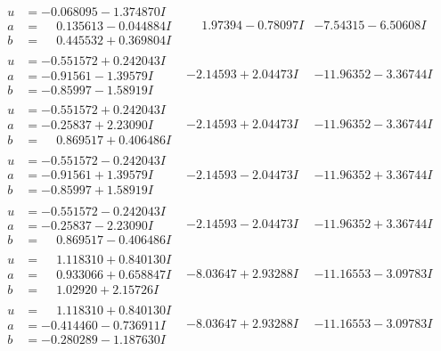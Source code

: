 \documentclass[1p]{elsarticle_modified}
\theoremstyle{definition}
\begin{document}
$$\begin{array}{c|c|c}
\begin{aligned}
u &= -0.068095 - 1.374870 I \\
a &= \phantom{-}0.135613 - 0.044884 I \\
b &= \phantom{-}0.445532 + 0.369804 I\end{aligned}
 & \phantom{-}1.97394 - 0.78097 I & -7.54315 - 6.50608 I \\ \hline\begin{aligned}
u &= -0.551572 + 0.242043 I \\
a &= -0.91561 - 1.39579 I \\
b &= -0.85997 - 1.58919 I\end{aligned}
 & -2.14593 + 2.04473 I & -11.96352 - 3.36744 I \\ \hline\begin{aligned}
u &= -0.551572 + 0.242043 I \\
a &= -0.25837 + 2.23090 I \\
b &= \phantom{-}0.869517 + 0.406486 I\end{aligned}
 & -2.14593 + 2.04473 I & -11.96352 - 3.36744 I \\ \hline\begin{aligned}
u &= -0.551572 - 0.242043 I \\
a &= -0.91561 + 1.39579 I \\
b &= -0.85997 + 1.58919 I\end{aligned}
 & -2.14593 - 2.04473 I & -11.96352 + 3.36744 I \\ \hline\begin{aligned}
u &= -0.551572 - 0.242043 I \\
a &= -0.25837 - 2.23090 I \\
b &= \phantom{-}0.869517 - 0.406486 I\end{aligned}
 & -2.14593 - 2.04473 I & -11.96352 + 3.36744 I \\ \hline\begin{aligned}
u &= \phantom{-}1.118310 + 0.840130 I \\
a &= \phantom{-}0.933066 + 0.658847 I \\
b &= \phantom{-}1.02920 + 2.15726 I\end{aligned}
 & -8.03647 + 2.93288 I & -11.16553 - 3.09783 I \\ \hline\begin{aligned}
u &= \phantom{-}1.118310 + 0.840130 I \\
a &= -0.414460 - 0.736911 I \\
b &= -0.280289 - 1.187630 I\end{aligned}
 & -8.03647 + 2.93288 I & -11.16553 - 3.09783 I \\ \hline\begin{aligned}

\end{aligned}
\end{array}$$
\end{document}
